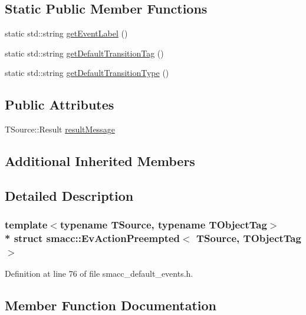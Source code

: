 \subsection*{Static Public Member Functions}
\begin{DoxyCompactItemize}
\item 
static std\+::string \hyperlink{structsmacc_1_1EvActionPreempted_a119a1e5e64588f86219a576721f379c2}{get\+Event\+Label} ()
\item 
static std\+::string \hyperlink{structsmacc_1_1EvActionPreempted_a93a1d4c70eea0581caa028c6cf9c9d38}{get\+Default\+Transition\+Tag} ()
\item 
static std\+::string \hyperlink{structsmacc_1_1EvActionPreempted_a6e316267502ae8001bb1a8eb3be9df57}{get\+Default\+Transition\+Type} ()
\end{DoxyCompactItemize}
\subsection*{Public Attributes}
\begin{DoxyCompactItemize}
\item 
T\+Source\+::\+Result \hyperlink{structsmacc_1_1EvActionPreempted_a6ea7569ccfc3e233b2d786606d01aece}{result\+Message}
\end{DoxyCompactItemize}
\subsection*{Additional Inherited Members}


\subsection{Detailed Description}
\subsubsection*{template$<$typename T\+Source, typename T\+Object\+Tag$>$\\*
struct smacc\+::\+Ev\+Action\+Preempted$<$ T\+Source, T\+Object\+Tag $>$}



Definition at line 76 of file smacc\+\_\+default\+\_\+events.\+h.



\subsection{Member Function Documentation}
